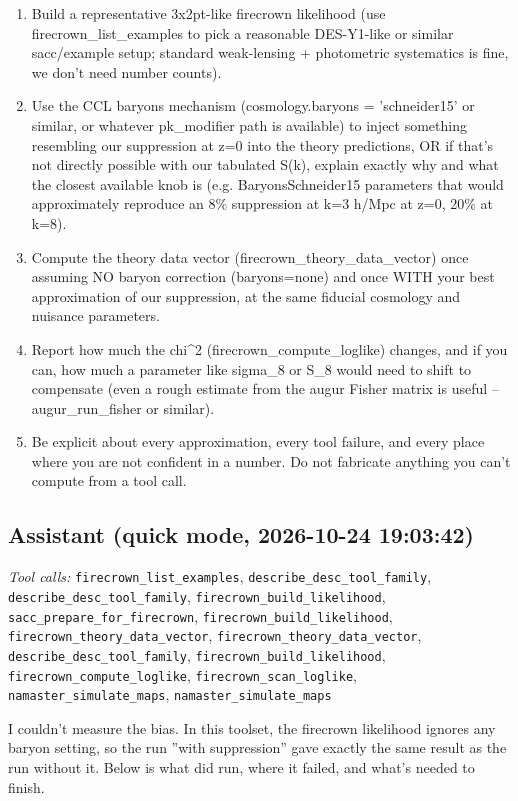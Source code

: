 \documentclass[11pt,a4paper]{article}
\begin{document}
\begin{enumerate}
  \item Build a representative 3x2pt-like firecrown likelihood (use firecrown\_list\_examples to pick a reasonable DES-Y1-like or similar sacc/example setup; standard weak-lensing + photometric systematics is fine, we don't need number counts).
  \item Use the CCL baryons mechanism (cosmology.baryons = 'schneider15' or similar, or whatever pk\_modifier path is available) to inject something resembling our suppression at z=0 into the theory predictions, OR if that's not directly possible with our tabulated S(k), explain exactly why and what the closest available knob is (e.g. BaryonsSchneider15 parameters that would approximately reproduce an 8\% suppression at k=3 h/Mpc at z=0, 20\% at k=8).
  \item Compute the theory data vector (firecrown\_theory\_data\_vector) once assuming NO baryon correction (baryons=none) and once WITH your best approximation of our suppression, at the same fiducial cosmology and nuisance parameters.
  \item Report how much the chi\textasciicircum{}2 (firecrown\_compute\_loglike) changes, and if you can, how much a parameter like sigma\_8 or S\_8 would need to shift to compensate (even a rough estimate from the augur Fisher matrix is useful -- augur\_run\_fisher or similar).
  \item Be explicit about every approximation, every tool failure, and every place where you are not confident in a number. Do not fabricate anything you can't compute from a tool call.
\end{enumerate}
\subsection*{Assistant \small(quick mode, 2026-10-24 19:03:42)}
\textit{Tool calls:} \texttt{firecrown\_list\_examples}, \texttt{describe\_desc\_tool\_family}, \texttt{describe\_desc\_tool\_family}, \texttt{firecrown\_build\_likelihood}, \texttt{sacc\_prepare\_for\_firecrown}, \texttt{firecrown\_build\_likelihood}, \texttt{firecrown\_theory\_data\_vector}, \texttt{firecrown\_theory\_data\_vector}, \texttt{describe\_desc\_tool\_family}, \texttt{firecrown\_build\_likelihood}, \texttt{firecrown\_compute\_loglike}, \texttt{firecrown\_scan\_loglike}, \texttt{namaster\_simulate\_maps}, \texttt{namaster\_simulate\_maps}\par
I couldn't measure the bias. In this toolset, the firecrown likelihood ignores any baryon setting, so the run ''with suppression'' gave exactly the same result as the run without it. Below is what did run, where it failed, and what's needed to finish.
\end{document}
